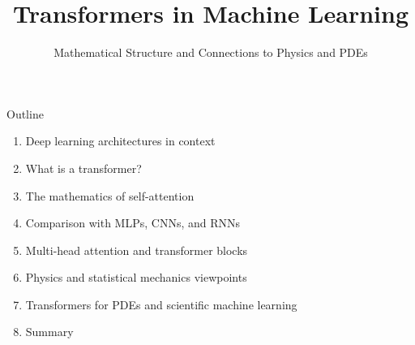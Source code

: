 \documentclass{beamer}
\title{Transformers in Machine Learning}
\subtitle{Mathematical Structure and Connections to Physics and PDEs}
\author{}
\date{}
\begin{document}
\frame{\titlepage}

\begin{frame}{Outline}
\begin{enumerate}
\item Deep learning architectures in context
\item What is a transformer?
\item The mathematics of self-attention
\item Comparison with MLPs, CNNs, and RNNs
\item Multi-head attention and transformer blocks
\item Physics and statistical mechanics viewpoints
\item Transformers for PDEs and scientific machine learning
\item Summary
\end{enumerate}
\end{frame}
\end{document}
